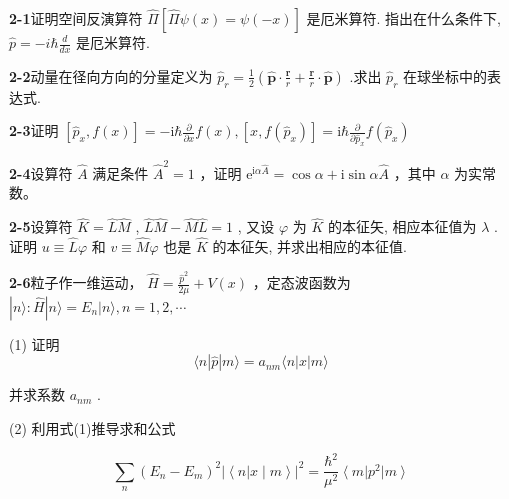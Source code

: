\textbf{2-1}\quad 证明空间反演算符 $\hat{\Pi}[\hat{\Pi}\psi(x)=\psi(-x)]$ 是厄米算符. 指出在什么条件下, $\hat{p}=-i\hbar\frac{d}{dx}$ 是厄米算符.

\vfill

\newpage
\vfill

\noindent
\textbf{2-2}\quad 动量在径向方向的分量定义为 $\hat{p}_r = \frac{1}{2}\left(\hat{\pmb{p}}\cdot \frac{\pmb{r}}{r} +\frac{\pmb{r}}{r}\cdot \hat{\pmb{p}}\right)$ .求出 $\hat{p}_r$ 在球坐标中的表达式.

\vfill

\newpage
\vfill

\noindent
\textbf{2-3}\quad 证明 $[\hat{p}_x, f(x)] = -\mathrm{i}\hbar \frac{\partial}{\partial x} f(x), [x, f(\hat{p}_x)] = \mathrm{i}\hbar \frac{\partial}{\partial \hat{p}_x} f(\hat{p}_x)$

\vfill

\newpage
\vfill

\noindent
\textbf{2-4}\quad 设算符 $\hat{A}$ 满足条件 $\hat{A}^2 = 1$ ，证明 $\mathrm{e}^{\mathrm{i}\alpha \hat{A}} = \cos \alpha + \mathrm{i}\sin \alpha \hat{A}$ ，其中 $\alpha$ 为实常数。

\vfill

\newpage
\vfill

\noindent
\textbf{2-5}\quad 设算符 $\hat{K} = \hat{L}\hat{M}$ , $\hat{L}\hat{M} - \hat{M}\hat{L} = 1$ , 又设 $\varphi$ 为 $\hat{K}$ 的本征矢, 相应本征值为 $\lambda$ . 证明 $u \equiv \hat{L}\varphi$ 和 $v \equiv \hat{M}\varphi$ 也是 $\hat{K}$ 的本征矢, 并求出相应的本征值.

\vfill

\newpage
\vfill

\noindent
\textbf{2-6}\quad 粒子作一维运动， $\hat{H} = \frac{\hat{p}^2}{2\mu} + V(x)$ ，定态波函数为 $|n\rangle: \hat{H}|n\rangle = E_n |n\rangle, n = 1, 2, \cdots$ 

(1) 证明
\begin{equation}\tag{1}
\langle n \left| \hat {p} \right| m \rangle = a _ {n m} \langle n | x | m \rangle
\end{equation}

并求系数 $a_{nm}$ . 

(2) 利用式(1)推导求和公式

\begin{equation}\tag{2}
\sum_ {n} (E _ {n} - E _ {m}) ^ {2} \left| \left\langle n \right| x \mid m \right\rangle \Big | ^ {2} = \frac {\hbar^ {2}}{\mu^ {2}} \left\langle m \right| p ^ {2} \left| m \right\rangle
\end{equation}

